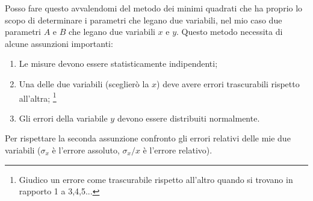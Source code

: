 \documentclass{article}
\begin{document}
	Posso fare questo avvalendomi del metodo dei minimi quadrati che ha  proprio lo scopo di determinare i parametri che legano due variabili, nel mio caso due parametri $A$ e $B$ che legano due variabili $x$ e $y$. Questo metodo necessita di alcune assunzioni importanti: 
	
	\begin{enumerate}
		\item Le misure devono essere statisticamente indipendenti;
		\item Una delle due variabili (sceglierò la $x$) deve avere errori trascurabili rispetto all'altra; \footnote{Giudico un errore come trascurabile rispetto all'altro quando si trovano in rapporto 1 a 3,4,5...}
		\item Gli errori della variabile $y$ devono essere distribuiti normalmente.
	\end{enumerate}
	
	\noindent
	Per rispettare la seconda assunzione confronto gli errori relativi delle mie due variabili ($\sigma_x$ è l'errore assoluto, $\sigma_x/x$ è l'errore relativo).
	
\end{document}
